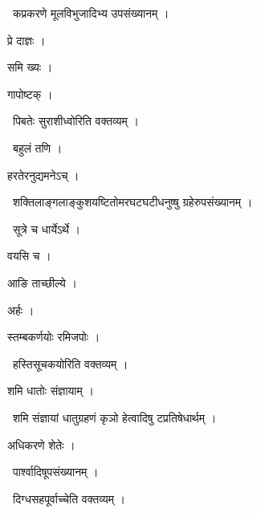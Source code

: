 \documentclass[10pt, openany, oneside]{book}
\begin{document}
\par\noindent\hspace{1.5em}{\vps वा॰}~{\qt कप्रकरणे मूलविभुजादिभ्य उपसंख्यानम् ।}

\noindent प्रे दाज्ञः ।

\noindent समि ख्यः ।

\noindent गापोष्टक् ।

\par\noindent\hspace{1.5em}{\vps वा॰}~{\qt पिबतेः सुराशीध्वोरिति वक्तव्यम् ।}

\par\noindent\hspace{1.5em}{\vps वा॰}~{\qt बहुलं तणि ।}

\noindent हरतेरनुद्यमनेऽच् ।

\par\noindent\hspace{1.5em}{\vps वा॰}~{\qt शक्तिलाङ्गलाङ्कुशयष्टितोमरघटघटीधनुष्षु ग्रहेरुपसंख्यानम् ।}

\par\noindent\hspace{1.5em}{\vps वा॰}~{\qt सूत्रे च धार्येऽर्थे ।}

\noindent वयसि च ।

\noindent आङि ताच्छील्ये ।

\noindent अर्हः ।

\noindent स्तम्बकर्णयोः रमिजपोः ।

\par\noindent\hspace{1.5em}{\vps वा॰}~{\qt हस्तिसूचकयोरिति वक्तव्यम् ।}

\noindent शमि धातोः संज्ञायाम् ।

\par\noindent\hspace{1.5em}{\vps वा॰}~{\qt शमि संज्ञायां धातुग्रहणं कृञो हेत्वादिषु टप्रतिषेधार्थम् ।}

\noindent अधिकरणे शेतेः ।

\par\noindent\hspace{1.5em}{\vps वा॰}~{\qt पार्श्वादिषूपसंख्यानम् ।}

\par\noindent\hspace{1.5em}{\vps वा॰}~{\qt दिग्धसहपूर्वाच्चेति वक्तव्यम् ।}
\end{document}
